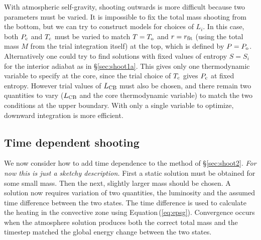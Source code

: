 \documentclass[12pt, preprint,numberedappendix]{emulateapj}
\newcommand{\Eq}[1]{Equation\,(\ref{#1})}
\newcommand{\Rg}{\mathcal{R}}
\newcommand{\co}{_{\rm c}}
\newcommand{\di}{_{\rm o}}
\newcommand{\cb}{_{\rm CB}}
\begin{document}
With atmospheric self-gravity, shooting outwards is more difficult because two parameters must be varied.  It is impossible to fix the total mass shooting from the bottom, but we can try to construct models for choices of $L_i$.  In this case,  both $P\co$ and $T\co$ must be varied to match $T = T\di$ and $r = r_{\rm fit}$ (using the total mass $M$ from the trial integration itself) at the top, which is defined by $P = P\di$.  Alternatively one could try to find solutions with fixed values of entropy $S = S_i$ for the interior adiabat as in \S\ref{sec:shoot1a}.  This gives only one thermodynamic variable to specify at the core, since the trial choice of $T\co$ gives $P\co$ at fixed entropy.  However trial values of $L\cb$ must also be chosen, and there remain two quantities to vary ($L\cb$ and the core thermodynamic variable) to match the two conditions at the upper boundary.  With only a single variable to optimize, downward integration is more efficient.  

\subsection{Time dependent shooting}\label{sec:timedep}
We now consider how to add time dependence to the method of \S\ref{sec:shoot2}.  \emph{For now this is just a sketchy description.}  First a static solution must be obtained for some small mass.  Then the next, slightly larger mass should be chosen.    A solution now requires variation of two quantities, the luminosity and the assumed time difference between the two states.  The time difference is used to calculate the heating in the convective zone using \Eq{eq:epsg}.  Convergence occurs when the atmosphere solution produces both the correct total mass and the timestep matched the global energy change between the two states. 





\end{document}
